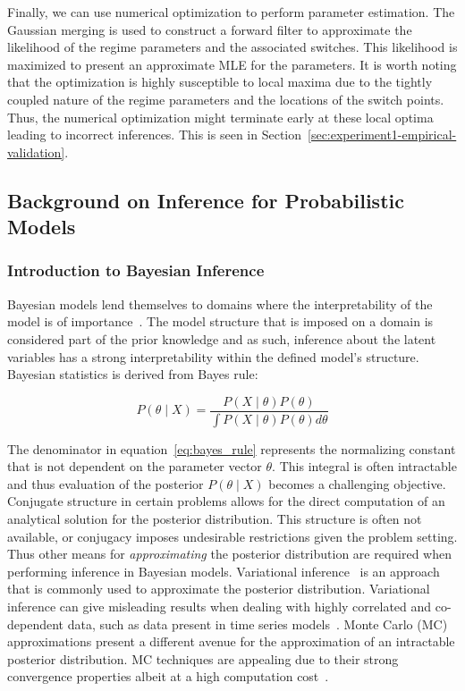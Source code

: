 Finally, we can use numerical optimization to perform parameter estimation. The Gaussian merging is used to construct a forward filter to approximate the likelihood of the regime parameters and the associated switches. This likelihood is maximized to present an approximate MLE for the parameters. It is worth noting that the optimization is highly susceptible to local maxima due to the tightly coupled nature of the regime parameters and the locations of the switch points. Thus, the numerical optimization might terminate early at these local optima leading to incorrect inferences. This is seen in Section~\ref{sec:experiment1-empirical-validation}.

\subsection{Background on Inference for Probabilistic Models}

\subsubsection{Introduction to Bayesian Inference}

Bayesian models lend themselves to domains where the interpretability of the model is of importance~\citep{gelman2014bayesian}. The model structure that is imposed on a domain is considered part of the prior knowledge and as such, inference about the latent variables has a strong interpretability within the defined model's structure. Bayesian statistics is derived from Bayes rule:

\begin{equation}\label{eq:bayes_rule}
	P(\theta \mid X) = \frac{P(X \mid \theta)P(\theta)}{\int P(X \mid \theta)P(\theta) d\theta}
\end{equation}

The denominator in equation~\ref{eq:bayes_rule} represents the normalizing constant that is not dependent on the parameter vector $\theta$. This integral is often intractable and thus evaluation of the posterior $P(\theta \mid X)$ becomes a challenging objective. Conjugate structure in certain problems allows for the direct computation of an analytical solution for the posterior distribution. This structure is often not available, or conjugacy imposes undesirable restrictions given the problem setting. Thus other means for \textit{approximating} the posterior distribution are required when performing inference in Bayesian models. Variational inference~\citep{attias2000variational,saul1996exploiting,saul1996mean,blei2003latent} is an approach that is commonly used to approximate the posterior distribution. Variational inference can give misleading results when dealing with highly correlated and co-dependent data, such as data present in time series models~\citep{turner2011two}. Monte Carlo (MC) approximations present a different avenue for the approximation of an intractable posterior distribution. MC techniques are appealing due to their strong convergence properties albeit at a high computation cost~\citep{mackay1998introduction}.

